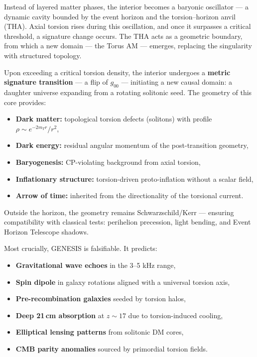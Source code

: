 \documentclass{article}
\begin{document}
Instead of layered matter phases, the interior becomes a baryonic oscillator — a dynamic cavity bounded by the event horizon and the torsion–horizon anvil (THA). Axial torsion rises during this oscillation, and once it surpasses a critical threshold, a signature change occurs. The THA acts as a geometric boundary, from which a new domain — the Torus AM — emerges, replacing the singularity with structured topology.



Upon exceeding a critical torsion density, the interior undergoes a \textbf{metric signature transition} — a flip of $g_{00}$ — initiating a new causal domain: a daughter universe expanding from a rotating solitonic seed. The geometry of this core provides:
\begin{itemize}
  \item \textbf{Dark matter:} topological torsion defects (solitons) with profile $\rho \sim e^{-2 m_T r}/r^2$,
  \item \textbf{Dark energy:} residual angular momentum of the post-transition geometry,
  \item \textbf{Baryogenesis:} CP-violating background from axial torsion,
  \item \textbf{Inflationary structure:} torsion-driven proto-inflation without a scalar field,
  \item \textbf{Arrow of time:} inherited from the directionality of the torsional current.
\end{itemize}

Outside the horizon, the geometry remains Schwarzschild/Kerr — ensuring compatibility with classical tests: perihelion precession, light bending, and Event Horizon Telescope shadows.

\vspace{1ex}

Most crucially, GENESIS is falsifiable. It predicts:
\begin{itemize}
  \item \textbf{Gravitational wave echoes} in the 3–5 kHz range,
  \item \textbf{Spin dipole} in galaxy rotations aligned with a universal torsion axis,
  \item \textbf{Pre-recombination galaxies} seeded by torsion halos,
  \item \textbf{Deep 21\,cm absorption} at $z \sim 17$ due to torsion-induced cooling,
  \item \textbf{Elliptical lensing patterns} from solitonic DM cores,
  \item \textbf{CMB parity anomalies} sourced by primordial torsion fields.
\end{itemize}
\end{document}
